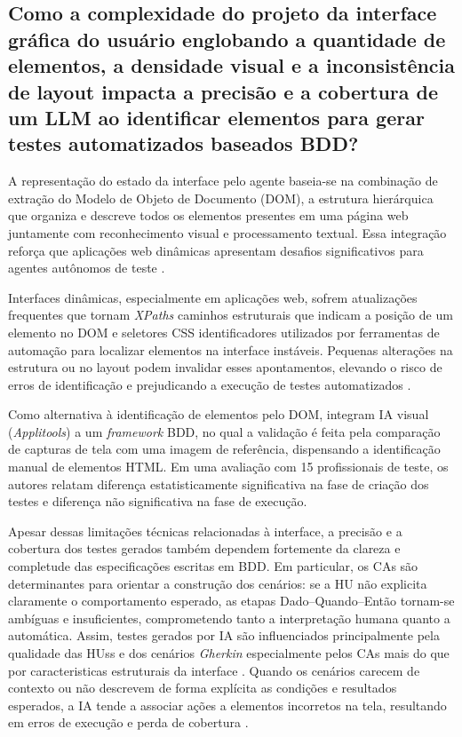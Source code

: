 \subsection{Como a complexidade do projeto da interface gráfica do usuário englobando a quantidade de elementos, a densidade visual e a inconsistência de layout impacta a precisão e a cobertura de um LLM ao identificar elementos para gerar testes automatizados baseados BDD?} 

A representação do estado da interface pelo agente baseia-se na combinação de extração do Modelo de Objeto de Documento (DOM), a estrutura hierárquica que organiza e descreve todos os elementos presentes em uma página web juntamente com reconhecimento visual e processamento textual. Essa integração reforça que aplicações web dinâmicas apresentam desafios significativos para agentes autônomos de teste \cite{Mughal2025}.

Interfaces dinâmicas, especialmente em aplicações web, sofrem atualizações frequentes que tornam \textit{XPaths} caminhos estruturais que indicam a posição de um elemento no DOM e seletores CSS identificadores utilizados por ferramentas de automação para localizar elementos na interface instáveis. Pequenas alterações na estrutura ou no layout podem invalidar esses apontamentos, elevando o risco de erros de identificação e prejudicando a execução de testes automatizados \cite{Pysmennyi2025}.

Como alternativa à identificação de elementos pelo DOM,  integram IA visual (\textit{Applitools}) a um \textit{framework} BDD, no qual a validação é feita pela comparação de capturas de tela com uma imagem de referência, dispensando a identificação manual de elementos HTML. Em uma avaliação com 15 profissionais de teste, os autores relatam diferença estatisticamente significativa na fase de criação dos testes e diferença não significativa na fase de execução.

Apesar dessas limitações técnicas relacionadas à interface, a precisão e a cobertura dos testes gerados também dependem fortemente da clareza e completude das especificações escritas em BDD. Em particular, os CAs são determinantes para orientar a construção dos cenários: se a HU não explicita claramente o comportamento esperado, as etapas Dado–Quando–Então tornam-se ambíguas e insuficientes, comprometendo tanto a interpretação humana quanto a automática. Assim, testes gerados por IA são influenciados principalmente pela qualidade das HUss e dos cenários \textit{Gherkin} especialmente pelos CAs mais do que por caracteristicas estruturais da interface \cite{Ferreira2025}. Quando os cenários carecem de contexto ou não descrevem de forma explícita as condições e resultados esperados, a IA tende a associar ações a elementos incorretos na tela, resultando em erros de execução e perda de cobertura \cite{Ferreira2025}.

